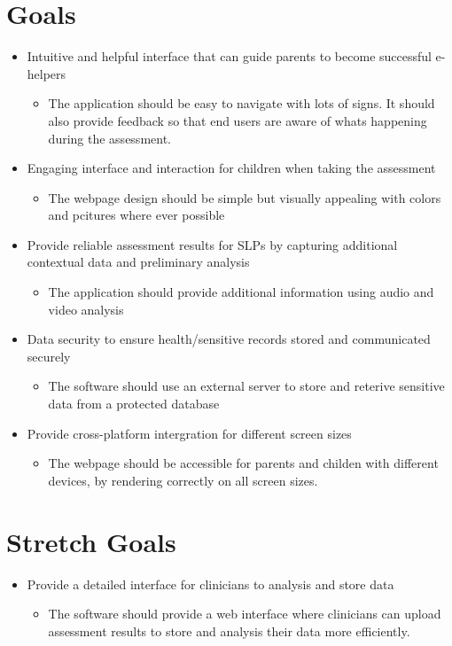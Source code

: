 \documentclass{article}
\begin{document}
\section{Goals}
\begin{itemize}
    \item Intuitive and helpful interface that can guide parents to become successful e-helpers
    \begin{itemize}
        \item The application should be easy to navigate with lots of signs. It should also provide feedback so that end users are aware of whats happening during the assessment.
    \end{itemize}
    
    \item Engaging interface and interaction for children when taking the assessment
    \begin{itemize}
        \item The webpage design should be simple but visually appealing with colors and pcitures where ever possible 
    \end{itemize}
    
    \item Provide reliable assessment results for SLPs by capturing additional contextual data and preliminary analysis
    \begin{itemize}
        \item The application should provide additional information using audio and video analysis
    \end{itemize}
    \item Data security to ensure health/sensitive records stored and communicated securely
    \begin{itemize}
        \item The software should use an external server to store and reterive sensitive data from a protected database
    \end{itemize}
    \item Provide cross-platform intergration for different screen sizes 
    \begin{itemize}
        \item The webpage should be accessible for parents and childen with different devices, by rendering correctly on all screen sizes. 
    \end{itemize}
\end{itemize}


\section{Stretch Goals}
\begin{itemize}
    \item  Provide a detailed interface for clinicians to analysis and store data
    \begin{itemize}
        \item The software should provide a web interface where clinicians can upload assessment results to store and analysis their data more efficiently.
    \end{itemize}
\end{itemize}
\end{document}
